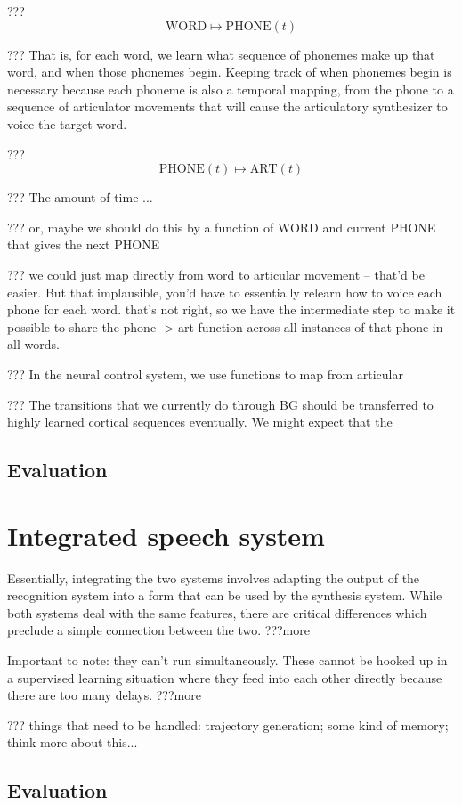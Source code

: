 ??? $$\text{WORD} \mapsto \text{PHONE}(t)$$

??? That is, for each word, we learn
what sequence of phonemes make up that word,
and when those phonemes begin.
Keeping track of when phonemes begin
is necessary because
each phoneme is also a temporal mapping,
from the phone to
a sequence of articulator movements
that will cause the articulatory synthesizer
to voice the target word.

??? $$\text{PHONE}(t) \mapsto \text{ART}(t)$$

??? The amount of time ...

??? or, maybe we should do this by
a function of WORD and current PHONE
that gives the next PHONE

??? we could just map directly from word
to articular movement -- that'd be easier.
But that implausible, you'd have to
essentially relearn how to voice each phone
for each word. that's not right, so we
have the intermediate step to make it
possible to share the phone -> art
function across all instances of that phone
in all words.

??? In the neural control system,
we use functions to map from
articular


??? The transitions that we currently do through
BG should be transferred to highly learned
cortical sequences eventually.
We might expect that the

\subsection{Evaluation}

\section{Integrated speech system}

Essentially, integrating the two systems
involves adapting the output of the recognition system
into a form that can be used by the synthesis system.
While both systems deal with the same features,
there are critical differences
which preclude a simple connection between the two.
???more

Important to note: they can't run simultaneously.
These cannot be hooked up in a supervised learning
situation where they feed into each other
directly because there are too many delays.
???more

??? things that need to be handled:
trajectory generation;
some kind of memory;
think more about this...

\subsection{Evaluation}
